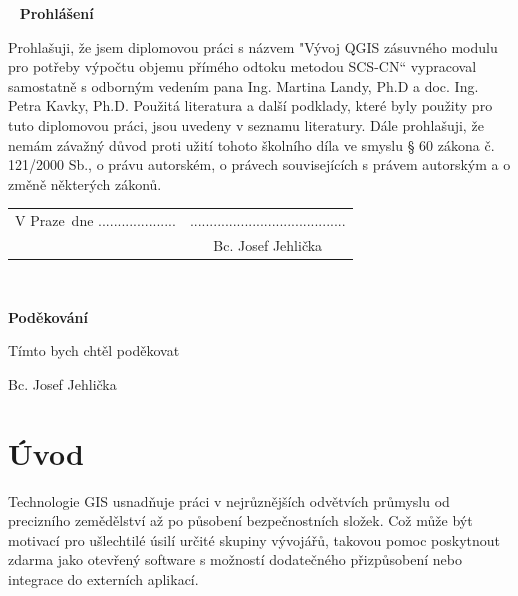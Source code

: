 \documentclass[a4paper,oneside,12pt]{book}
\newcommand{\tb}{\textbf} %
\newcommand{\autor}{Bc. Josef Jehlička}   %
\newcommand{\kde}{Praze} %
\newcommand{\prohlaseni}{Prohlašuji, že jsem diplomovou práci s názvem "Vývoj QGIS zásuvného modulu pro potřeby výpočtu objemu přímého odtoku metodou SCS-CN“ vypracoval samostatně s odborným vedením pana Ing. Martina Landy, Ph.D a doc. Ing. Petra Kavky, Ph.D. Použitá literatura a další podklady, které byly použity pro tuto diplomovou práci, jsou uvedeny v seznamu literatury. Dále prohlašuji, že nemám závažný důvod proti užití tohoto školního díla ve smyslu § 60 zákona č. 121/2000 Sb., o právu autorském, o právech souvisejících s právem autorským a o změně některých zákonů.
} %
\newcommand{\podekovani}{Tímto bych chtěl poděkovat } %
\begin{document}
\newpage %
\thispagestyle{empty}  %

~ %
\vfill %
\vspace{1em}
\tb{Prohlášení} %

\vspace{1em} %
\prohlaseni

\vspace{2em}  %
\hspace{-0.5em}\begin{tabularx}{\textwidth}{X c}  %
V \kde\ dne .................... &........................................ \\	%
	& \autor
\end{tabularx}	%







\newpage %
\thispagestyle{empty}  %

~
\vfill %


\vspace{1em}
\tb{Poděkování}

\vspace{1em} %
\podekovani
\begin{flushright}
\autor
\end{flushright}  %





\newpage
\tableofcontents


\newpage
\chapter*{Úvod} \label{uvod}
Technologie GIS usnadňuje práci v nejrůznějších odvětvích průmyslu od precizního zemědělství až po působení bezpečnostních složek. Což může být motivací pro ušlechtilé úsilí určité skupiny vývojářů, takovou pomoc poskytnout zdarma jako otevřený software s možností dodatečného přizpůsobení nebo integrace do externích aplikací. 
\end{document}

